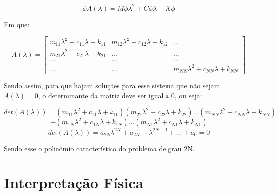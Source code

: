 \documentclass[12pt,a4paper]{article}
\begin{document}
\begin{equation}
    \phi A(\lambda) = M\phi\lambda^2 + C\phi\lambda + K\phi
    \label{eq:eom}
\end{equation}

\noindent Em que:

\begin{equation}
    A(\lambda) = 
    \begin{bmatrix}
        m_{11}\lambda^2+c_{11}\lambda+k_{11} & m_{12}\lambda^2+c_{12}\lambda+k_{12} & ... \\
        m_{21}\lambda^2+c_{21}\lambda+k_{21} & ... & ...\\
        ... & ... & ...\\
        ... & ... & m_{NN}\lambda^2+c_{NN}\lambda+k_{NN}
    \end{bmatrix}
    \label{eq:eom}
\end{equation}

\noindent Sendo assim, para que hajam soluções para esse sistema que não sejam $A(\lambda) = 0$, o determinante da matriz deve ser igual a 0, ou seja:

\begin{equation}
    det(A(\lambda)) = (m_{11}\lambda^2+c_{11}\lambda+k_{11})(m_{22}\lambda^2+c_{22}\lambda+k_{22})...(m_{NN}\lambda^2+c_{NN}\lambda+k_{NN})
\end{equation}
\begin{equation}    
    - (m_{1N}\lambda^2+c_{1N}\lambda+k_{1N})...(m_{N1}\lambda^2+c_{N1}\lambda+k_{N1})
\end{equation}
\begin{equation}    
    det(A(\lambda)) = a_{2N}\lambda^{2N} + a_{2N-1}\lambda^{2N-1}+...+a_0 = 0
\end{equation}

\noindent Sendo esse o polinômio característico do problema de grau 2N.

\section{Interpretação Física}
\end{document}
